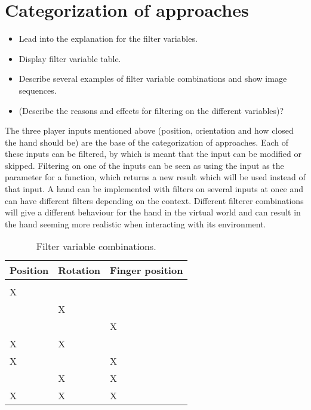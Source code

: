 
\section{Categorization of approaches}
\label{sec:categorizationOfApproaches}
\begin{itemize}
\item Lead into the explanation for the filter variables.
\item Display filter variable table.
\item Describe several examples of filter variable combinations and show image sequences.
\item (Describe the reasons and effects for filtering on the different variables)?
\end{itemize}

The three player inputs mentioned above (position, orientation and how closed the hand should be) are the base of the categorization of approaches. Each of these inputs can be filtered, by which is meant that the input can be modified or skipped. Filtering on one of the inputs can be seen as using the input as the parameter for a function, which returns a new result which will be used instead of that input. A hand can be implemented with filters on several inputs at once and can have different filters depending on the context. Different filterer combinations will give a different behaviour for the hand in the virtual world and can result in the hand seeming more realistic when interacting with its environment.

\begin{table}[H]
\centering
\caption{Filter variable combinations.}
\label{tab:filterVariableCombinations}
\begin{tabular}{C{2cm}C{2cm}C{2cm}}
Position & Rotation & Finger position \\ \midrule \midrule
				&					&					\\ \midrule
\Large X	&					&					\\ \midrule
				& \Large X	& 		                \\ \midrule
				&					& \Large X     \\ \midrule
\Large X	& \Large X	&					\\ \midrule
\Large X 	&					& \Large X	\\ \midrule
				& \Large X	& \Large X	\\ \midrule
\Large X 	& \Large X 	& \Large X
\end{tabular}
\end{table}

